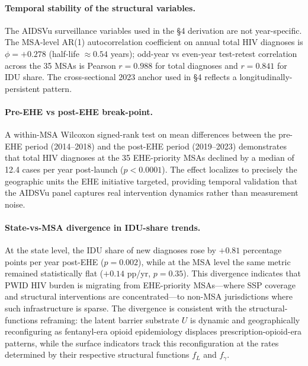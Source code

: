 \documentclass[12pt]{article}
\begin{document}
\paragraph{Temporal stability of the structural variables.} The AIDSVu surveillance variables used in the §4 derivation are not year-specific. The MSA-level AR(1) autocorrelation coefficient on annual total HIV diagnoses is $\phi = +0.278$ (half-life $\approx 0.54$ years); odd-year vs even-year test-retest correlation across the 35 MSAs is Pearson $r = 0.988$ for total diagnoses and $r = 0.841$ for IDU share. The cross-sectional 2023 anchor used in §4 reflects a longitudinally-persistent pattern.

\paragraph{Pre-EHE vs post-EHE break-point.} A within-MSA Wilcoxon signed-rank test on mean differences between the pre-EHE period (2014--2018) and the post-EHE period (2019--2023) demonstrates that total HIV diagnoses at the 35 EHE-priority MSAs declined by a median of 12.4 cases per year post-launch ($p < 0.0001$). The effect localizes to precisely the geographic units the EHE initiative targeted, providing temporal validation that the AIDSVu panel captures real intervention dynamics rather than measurement noise.

\paragraph{State-vs-MSA divergence in IDU-share trends.} At the state level, the IDU share of new diagnoses rose by $+0.81$ percentage points per year post-EHE ($p = 0.002$), while at the MSA level the same metric remained statistically flat ($+0.14$ pp/yr, $p = 0.35$). This divergence indicates that PWID HIV burden is migrating from EHE-priority MSAs---where SSP coverage and structural interventions are concentrated---to non-MSA jurisdictions where such infrastructure is sparse. The divergence is consistent with the structural-functions reframing: the latent barrier substrate $U$ is dynamic and geographically reconfiguring as fentanyl-era opioid epidemiology displaces prescription-opioid-era patterns, while the surface indicators track this reconfiguration at the rates determined by their respective structural functions $f_L$ and $f_\gamma$.
\end{document}
